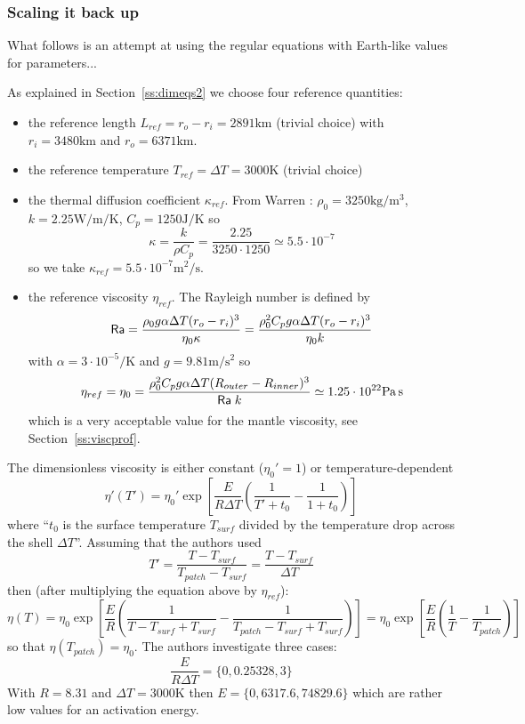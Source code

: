 \subsubsection*{Scaling it back up}

What follows is an attempt at using the regular equations with Earth-like values for parameters...

As explained in Section~\ref{ss:dimeqs2} we choose four reference quantities:
\begin{itemize}
\item the reference length $L_{ref}=r_o-r_i=2891\si{\kilo\metre}$ (trivial choice)
with $r_i=3480\si{\km}$ and $r_o=6371\si{\km}$.


\item the reference temperature $T_{ref}=\Delta T = 3000\si{\kelvin}$ (trivial choice)

\item the thermal diffusion coefficient $\kappa_{ref}$. From Warren \etal \cite{wabj08}:
$\rho_0=3250\si{\kg\per\cubic\metre}$,  $k=2.25 \si{\watt\per\metre\per\kelvin}$,  $C_p=1250 \si{\joule\per\kelvin}$
so 
\[
\kappa = \frac{k}{\rho C_p} =	\frac{2.25}{3250 \cdot 1250} \simeq 5.5\cdot 10^{-7} 
\]
so we take $\kappa_{ref} = 5.5\cdot 10^{-7} \si{\square\metre\per\second}$.

\item the reference viscosity $\eta_{ref}$. The Rayleigh number is defined by
\[
{\mathsf{Ra}} 
= \frac{\rho_0 g \alpha \Delta T (r_o-r_i)^3}{\eta_0 \kappa}
=\frac{\rho_0^2 C_p g \alpha \Delta T (r_o-r_i)^3}{\eta_0 k}
\]
with $\alpha=3\cdot 10^{-5} \si{\per\kelvin}$ and $g=9.81\si{\metre\per\square\second}$
so 
\[
\eta_{ref}=\eta_0 =\frac{\rho_0^2 C_p g \alpha \Delta T (R_{outer}-R_{inner})^3}{{\mathsf{Ra}} \; k}
\simeq 1.25 \cdot 10^{22}\si{\pascal\second}
\]
which is a very acceptable value for the mantle viscosity, see Section~\ref{ss:viscprof}.
\end{itemize}

\noindent The dimensionless viscosity is either constant ($\eta_0'=1$) or temperature-dependent 
\[
\eta'(T')
=\eta_0' \exp\left[ \frac{E}{R \Delta T} \left( \frac{1}{T'+t_0} -\frac{1}{1+t_0}  \right)   \right]
\]
where ``$t_0$ is the surface temperature $T_{surf}$ divided by 
the temperature drop across the shell $\Delta T$''.
Assuming that the authors used 
\[
T'=\frac{T-T_{surf}}{T_{patch}-T_{surf}}= \frac{T-T_{surf}}{\Delta T}
\]
then (after multiplying the equation above by $\eta_{ref}$): 
\[
\eta(T)
=\eta_0 \exp\left[ \frac{E}{R} \left( \frac{1}{T-T_{surf}  + T_{surf}} 
-\frac{1}{T_{patch}-T_{surf} + T_{surf}}  \right)   \right]
=\eta_0 \exp\left[ \frac{E}{R} \left( \frac{1}{T} -\frac{1}{T_{patch}}\right) \right]
\]
so that $\eta(T_{patch})=\eta_0$. The authors investigate three cases:
\[
\frac{E}{R \Delta T} = \{0,0.25328,3\}
\]
With $R=8.31$ and $\Delta T=3000\si{\kelvin}$ then $E=\{ 0, 6317.6 , 74829.6 \}$ which 
are rather low values for an activation energy. 

